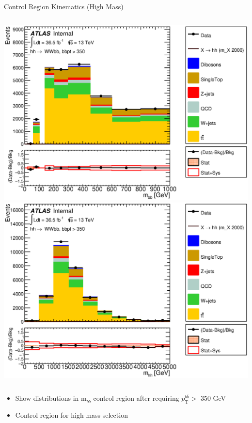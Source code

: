 \documentclass{beamer}
\newcommand*{\ptbb}{\ensuremath{p_{\text{T}}^{b\bar{b}}}\xspace}
\newcommand*{\mbb}{\ensuremath{\text{m}_{b\bar{b}}}\xspace}
\begin{document}
{\begin{frame}{Control Region Kinematics (High Mass)}
\begin{columns}
      \includegraphics*[width=1.9\textwidth] {../chapters/dihiggs2/figures/ControlPlots/36ifb_CPUpdated_opt2000_mBBcr_plots_103/C_mBBcr_opt2000ichep_bbpt350_bbMass_regionA_met25d020}\\
      \includegraphics*[width=1.9\textwidth] {../chapters/dihiggs2/figures/ControlPlots/36ifb_CPUpdated_opt2000_mBBcr_plots_103/C_mBBcr_opt2000ichep_bbpt350_hhMass_regionA_met25d020}
    \end{columns}
  \begin{itemize}\small
  \item Show distributions in \mbb control region after requiring \ptbb $>$ 350 GeV
  \item Control region for high-mass selection
  \end{itemize}
  \end{frame}

}
\end{document}
